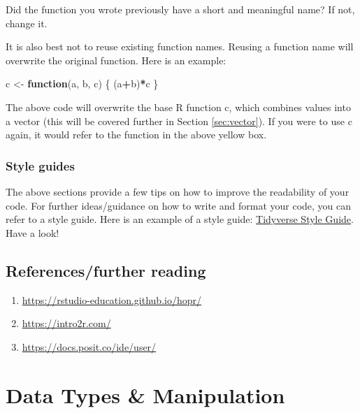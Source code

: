 \documentclass[
]{book}
\newenvironment{Shaded}{\begin{snugshade}}{\end{snugshade}}
\newcommand{\ControlFlowTok}[1]{\textcolor[rgb]{0.13,0.29,0.53}{\textbf{#1}}}
\newcommand{\NormalTok}[1]{#1}
\newcommand{\OtherTok}[1]{\textcolor[rgb]{0.56,0.35,0.01}{#1}}
\newcommand{\SpecialCharTok}[1]{\textcolor[rgb]{0.81,0.36,0.00}{\textbf{#1}}}
\providecommand{\tightlist}{%
  \setlength{\itemsep}{0pt}\setlength{\parskip}{0pt}}
\begin{document}
Did the function you wrote previously have a short and meaningful name? If not, change it.

It is also best not to reuse existing function names. Reusing a function name will overwrite the original function. Here is an example:

\begin{Shaded}
\begin{Highlighting}[]
\NormalTok{c }\OtherTok{\textless{}{-}} \ControlFlowTok{function}\NormalTok{(a, b, c) \{}
\NormalTok{  (a}\SpecialCharTok{+}\NormalTok{b)}\SpecialCharTok{*}\NormalTok{c}
\NormalTok{\}}
\end{Highlighting}
\end{Shaded}

The above code will overwrite the base R function c, which combines values into a vector (this will be covered further in Section \ref{sec:vector}). If you were to use c again, it would refer to the function in the above yellow box.

\subsection{Style guides}\label{sec:styleGuides}

The above sections provide a few tips on how to improve the readability of your code. For further ideas/guidance on how to write and format your code, you can refer to a style guide. Here is an example of a style guide: \href{https://style.tidyverse.org/}{Tidyverse Style Guide}. Have a look!

\section{References/further reading}\label{referencesfurther-reading}

\begin{enumerate}
\def\labelenumi{\arabic{enumi}.}
\tightlist
\item
  \url{https://rstudio-education.github.io/hopr/}
\item
  \url{https://intro2r.com/}
\item
  \url{https://docs.posit.co/ide/user/}
\end{enumerate}

\chapter{Data Types \& Manipulation}\label{ch-3}
\end{document}

